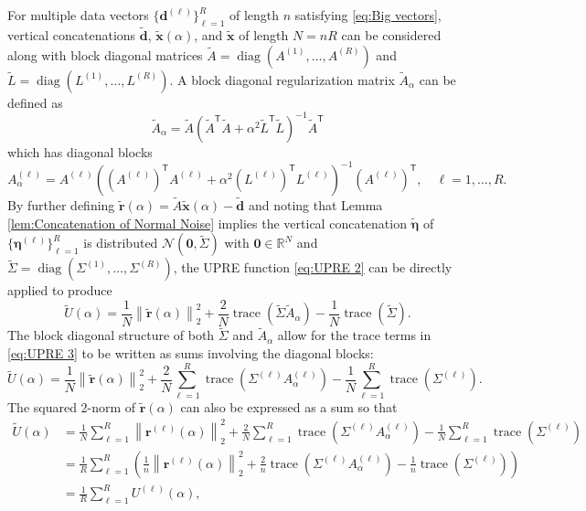 \documentclass[12pt]{article}
\newcommand{\dVec}{\mathbf{d}}	%
\newcommand{\rVec}{\mathbf{r}}	%
\newcommand{\xVec}{\mathbf{x}}	%
\newcommand{\trans}[1]{{#1}^\mathsf{T}}	%
\DeclareMathOperator{\trace}{trace}		%
\DeclareMathOperator{\diag}{diag}	%
\newcommand{\regparam}{\alpha}
\newcommand{\noise}{\eta}	%
\newcommand{\noiseVec}{\bm{\noise}}	%
\newcommand{\zeroVec}{\bm{0}}	%
\newcommand{\U}{U}	%
\begin{document}
For multiple data vectors $\{\dVec^{(\ell)}\}_{\ell=1}^R$ of length $n$ satisfying \eqref{eq:Big vectors}, vertical concatenations $\widetilde{\dVec}$, $\widetilde{\xVec}(\regparam)$, and $\widetilde{\xVec}$ of length $N = nR$ can be considered along with block diagonal matrices $\widetilde{A} = \diag(A^{(1)},\ldots,A^{(R)})$ and $\widetilde{L} = \diag(L^{(1)},\ldots,L^{(R)})$. A block diagonal regularization matrix $\widetilde{A}_\regparam$ can be defined as
\[\widetilde{A}_\regparam = \widetilde{A}(\trans{\widetilde{A}}\widetilde{A} + \regparam^2\trans{\widetilde{L}}\widetilde{L})^{-1}\trans{\widetilde{A}}\]
which has diagonal blocks
\begin{equation}
\label{eq:Diagonal blocks}
A^{(\ell)}_\regparam = A^{(\ell)}\left(\trans{\left(A^{(\ell)}\right)}A^{(\ell)} + \regparam^2\trans{\left(L^{(\ell)}\right)}L^{(\ell)}\right)^{-1}\trans{\left(A^{(\ell)}\right)}, \quad \ell = 1,\ldots,R.
\end{equation}
By further defining $\widetilde{\rVec}(\regparam) = \widetilde{A}\widetilde{\xVec}(\regparam) - \widetilde{\dVec}$ and noting that Lemma \ref{lem:Concatenation of Normal Noise} implies the vertical concatenation $\widetilde{\noiseVec}$ of $\{\noiseVec^{(\ell)}\}_{\ell=1}^R$ is distributed $\mathcal{N}(\zeroVec,\widetilde{\Sigma})$ with $\zeroVec \in \mathbb{R}^N$ and $\widetilde{\Sigma} = \diag(\Sigma^{(1)},\ldots,\Sigma^{(R)})$, the UPRE function \eqref{eq:UPRE 2} can be directly applied to produce
\begin{equation}
\label{eq:UPRE 3}
\widetilde{\U}(\regparam) = \frac{1}{N}\left\|\widetilde{\rVec}(\regparam)\right\|_2^2 + \frac{2}{N}\trace\left(\widetilde{\Sigma}\widetilde{A}_\regparam\right) - \frac{1}{N}\trace\left(\widetilde{\Sigma}\right).
\end{equation}
The block diagonal structure of both $\widetilde{\Sigma}$ and $\widetilde{A}_\regparam$ allow for the trace terms in \eqref{eq:UPRE 3} to be written as sums involving the diagonal blocks:
\begin{equation}
\label{eq:UPRE 4}
\widetilde{\U}(\regparam) = \frac{1}{N}\left\|\widetilde{\rVec}(\regparam)\right\|_2^2 + \frac{2}{N} \sum_{\ell=1}^R \trace\left(\Sigma^{(\ell)}A^{(\ell)}_\regparam\right) - \frac{1}{N} \sum_{\ell=1}^R \trace\left(\Sigma^{(\ell)}\right).
\end{equation}
The squared 2-norm of $\widetilde{\rVec}(\regparam)$ can also be expressed as a sum so that
\begin{align}
\label{eq:Averaged UPRE}
\widetilde{\U}(\regparam) &= \frac{1}{N} \sum_{\ell=1}^R \left\|\rVec^{(\ell)}(\regparam)\right\|_2^2 + \frac{2}{N} \sum_{\ell=1}^R \trace\left(\Sigma^{(\ell)} A_\regparam^{(\ell)}\right) - \frac{1}{N} \sum_{\ell=1}^R \trace\left(\Sigma^{(\ell)}\right) \nonumber \\
&= \frac{1}{R} \sum_{\ell=1}^R \left(\frac{1}{n}\left\|\rVec^{(\ell)}(\regparam)\right\|_2^2 + \frac{2}{n} \trace\left(\Sigma^{(\ell)} A_\regparam^{(\ell)}\right) - \frac{1}{n} \trace\left(\Sigma^{(\ell)}\right)\right) \nonumber \\
&= \frac{1}{R} \sum_{\ell=1}^R \U^{(\ell)}(\regparam),
\end{align}
\end{document}
